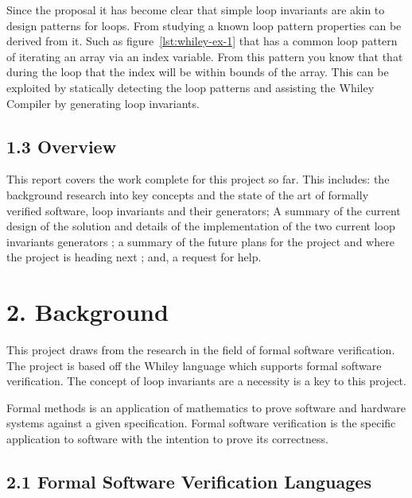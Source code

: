 \documentclass[11pt, a4paper, twoside, openright]{report}
\begin{document}
Since the proposal it has become clear that simple loop invariants are
akin to design patterns for loops.
From studying a known loop pattern properties can be derived from it.
Such as figure~\ref{lst:whiley-ex-1} that has a common loop pattern of
iterating an array via an index variable.
From this pattern you know that that during the loop that the index will be
within bounds of the array.
This can be exploited by statically detecting the loop patterns and assisting
the Whiley Compiler by generating loop invariants.

\subsection*{1.3 Overview}

This report covers the work complete for this project so far.
This includes: the background research into key concepts and the state of the
art of formally verified software, loop invariants and their generators;
A summary of the current design of the solution and details of the
implementation of the two current loop invariants generators ;
a summary of the future plans for the project and where the project
is heading next ; and, a request for help.

\section*{2. Background}

This project draws from the research in the field of formal software verification.
The project is based off the Whiley language which supports formal software
verification. %
The concept of loop invariants are a necessity is a key to this project.

Formal methods is an application of mathematics to prove software and hardware
systems against a given specification. %
Formal software verification is the specific application to software with
the intention to prove its correctness.



\subsection*{2.1 Formal Software Verification Languages}
\end{document}
